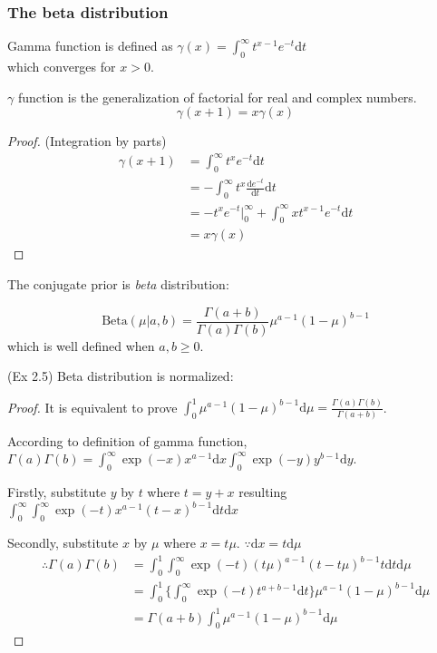 \subsubsection{The beta distribution}
\begin{definition}
Gamma function is defined as $\gamma(x)=\int_{0}^{\infty}t^{x-1}e^{-t}\text{d}t$\\
which converges for $x>0$.
\end{definition}
\begin{conclusion}
$\gamma$ function is the generalization of factorial for real and complex numbers.
\begin{equation}
\gamma(x+1)=x\gamma(x)
\label{eqn:factorialgamma}
\end{equation}
\end{conclusion}
\begin{proof}
(Integration by parts) 
\begin{equation}
\begin{split}
\gamma(x+1)&=\int_{0}^{\infty}t^{x}e^{-t}\text{d}t\\
&=-\int_{0}^{\infty}t^{x}\frac{\text{d}e^{-t}}{\text{d}t}\text{d}t\\
&=-t^{x}e^{-t}\vert_{0}^{\infty}+\int_{0}^{\infty}xt^{x-1}e^{-t}\text{d}t\\
&=x\gamma(x)
\end{split}
\end{equation}
\end{proof}
The conjugate prior is \emph{beta} distribution:
\begin{definition}
\begin{equation}
\text{Beta}(\mu\vert{}a,b)=\frac{\Gamma(a+b)}{\Gamma(a)\Gamma(b)}\mu^{a-1}(1-\mu)^{b-1}
\label{eqn:betadist}
\end{equation}
which is well defined when $a,b\geq{}0$.
\end{definition}
(Ex 2.5) Beta distribution is normalized:
\begin{proof}
It is equivalent to prove $\int_{0}^{1}\mu^{a-1}(1-\mu)^{b-1}\text{d}\mu=\frac{\Gamma(a)\Gamma(b)}{\Gamma(a+b)}$.


According to definition of gamma function, $\Gamma(a)\Gamma(b)=\int_{0}^{\infty}\exp{}(-x)x^{a-1}\text{d}x\int_{0}^{\infty}\exp{}(-y)y^{b-1}\text{d}y$.



Firstly, substitute $y$ by $t$ where $t=y+x$ resulting $\int_{0}^{\infty}\int_{0}^{\infty}\exp{}(-t)x^{a-1}(t-x)^{b-1}\text{d}t\text{d}x$


Secondly, substitute $x$ by $\mu$ where $x=t\mu$. $\because\text{d}x=t\text{d}\mu$
\begin{equation}
\begin{split}
\therefore\Gamma(a)\Gamma(b)&=\int_{0}^{1}\int_{0}^{\infty}\exp{}(-t)(t\mu)^{a-1}(t-t\mu)^{b-1}t\text{d}t\text{d}\mu\\
&=\int_{0}^{1}\{\int_{0}^{\infty}\exp{}(-t)t^{a+b-1}\text{d}t\}\mu^{a-1}(1-\mu)^{b-1}\text{d}\mu\\
&=\Gamma(a+b)\int_{0}^{1}\mu^{a-1}(1-\mu)^{b-1}\text{d}\mu
\end{split}
\label{eqn:gammaasintcircle}
\end{equation}
\end{proof}
